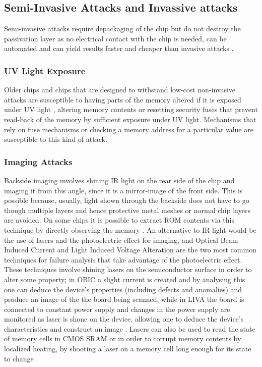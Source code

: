 	\subsection{Semi-Invasive Attacks and Invassive attacks}
	Semi-invasive attacks require depackaging of the chip but do not destroy the passivation layer as no electrical contact with the chip is needed, can be automated and can yield results faster and cheaper than invasive attacks \citep{sergei:thesis}.
	
	\subsubsection{UV Light Exposure}
	Older chips and chips that are designed to withstand low-cost non-invasive attacks are susceptible to having parts of the memory altered if it is exposed under UV light \citep{sergei:thesis}, altering memory contents or resetting security fuses that prevent read-back of the memory by sufficient exposure under UV light. Mechanisms that rely on fuse mechanisms or checking a memory address for a particular value are susceptible to this kind of attack.

	\subsubsection{Imaging Attacks}
	Backside imaging involves shining IR light on the rear side of the chip and imaging it from this angle, since it is a mirror-image of the front side. This is possible because, usually, light shown through the backside does not have to go though multiple layers and hence protective metal meshes or normal chip layers are avoided. On some chips it is possible to extract ROM contents via this technique by directly observing the memory \citep{sergei:thesis}. An alternative to IR light would be the use of lasers and the photoelectric effect for imaging, and Optical Beam Induced Current and Light Induced Voltage Alteration are the two most common techniques for failure analysis that take advantage of the photoelectric effect. These techniques involve shining lasers on the semiconductor surface in order to alter some property; in OBIC a slight current is created and by analysing this one can deduce the device's properties (including defects and anomalies) and produce an image of the the board being scanned, while in LIVA the board is connected to constant power supply and changes in the power supply are monitored as laser is shone on the device, allowing one to deduce the device's characteristics and construct an image \citep{cole:OBIC}. Lasers can also be used to read the state of memory cells in CMOS SRAM \citep{sergei:thesis} or in order to corrupt memory contents by localized heating, by shooting a laser on a memory cell long enough for its state to change \citep{website:riscure} \citep{sergei:thesis}.
	
